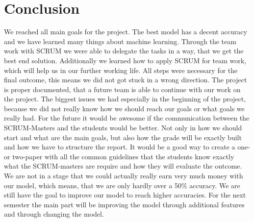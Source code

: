 
\chapter{Conclusion}
\label{chap:conclusion}
We reached all main goals for the project. The best model has a decent accuracy and we have learned many things about machine learning. Through the team work with SCRUM we were able to delegate the tasks in a way, that we get the best end solution. Additionally we learned how to apply SCRUM for team work, which will help us in our further working life. All steps were necessary for the final outcome, this means we did not got stuck in a wrong direction. The project is proper documented, that a future team is able to continue with our work on the project. The biggest issues we had especially in the beginning of the project, because we did not really know how we should reach our goals or what goals we really had. For the future it would be awesome if the communication between the SCRUM-Masters and the students would be better. Not only in how we should start and what are the main goals, but also how the grade will be exactly built and how we have to structure the report. It would be a good way to create a one- or two-paper with all the common guidelines that the students know exactly what the SCRUM-masters are require and how they will evaluate the outcome. We are not in a stage that we could actually really earn very much money with our model, which means, that we are only hardly over a 50\% accuracy. We are still have the goal to improve our model to reach higher accuracies. For the next semester the main part will be improving the model through additional features and through changing the model.
